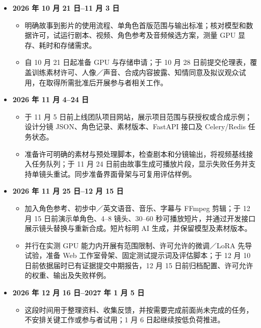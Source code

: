 \documentclass[a4paper,12pt]{article}
\begin{document}
\begin{itemize}
  \item \textbf{2026 年 10 月 21 日--11 月 3 日}
    \begin{itemize}
      \item 明确故事到影片的使用流程、单角色首版范围与输出标准；核对模型和数据许可，试运行剧本、视频、角色参考及音频候选方案，测量 GPU 显存、耗时和存储需求。
      \item 自 10 月 21 日起准备 GPU 与存储申请；于 10 月 28 日前提交伦理表，覆盖训练素材许可、人像／声音、合成内容披露、知情同意及拟议观众试用，在取得所需批准后开展参与者相关工作。
    \end{itemize}

  \item \textbf{2026 年 11 月 4--24 日}
    \begin{itemize}
      \item 于 11 月 5 日前上线团队项目网站，展示项目范围与获授权或合成示例；设计分镜 JSON、角色记录、素材版本、FastAPI 接口及 Celery/Redis 任务状态。
      \item 准备许可明确的素材与预处理脚本，检查剧本和分镜输出，将视频基线接入任务队列；于 11 月 24 日前由故事生成可播放片段，显示失败任务并支持单镜头重试。同步准备界面骨架与可复用评估样例。
    \end{itemize}

  \item \textbf{2026 年 11 月 25 日--12 月 15 日}
    \begin{itemize}
      \item 加入角色参考、初步中／英文语音、音乐、字幕与 FFmpeg 剪辑；于 12 月 15 日前演示单角色、4--8 镜头、30--60 秒可播放短片，并通过开发接口展示镜头替换与重新合成。短片标明 AI 生成，并保留模型及素材版本。
      \item 并行在实测 GPU 能力内开展有范围限制、许可允许的微调／LoRA 先导试验，准备 Web 工作室骨架、固定测试提示词及评估脚本；于 12 月 10 日前依据届时已有证据提交中期报告，12 月 15 日前归档配置、许可允许的权重、输出及失败样例。
    \end{itemize}

  \item \textbf{2026 年 12 月 16 日--2027 年 1 月 5 日}
    \begin{itemize}
      \item 这段时间用于整理资料、收集反馈，并按需要完成前面尚未完成的任务，不安排关键工作或参与者试用；1 月 6 日起继续按低负荷推进。
    \end{itemize}


\end{itemize}
\end{document}
